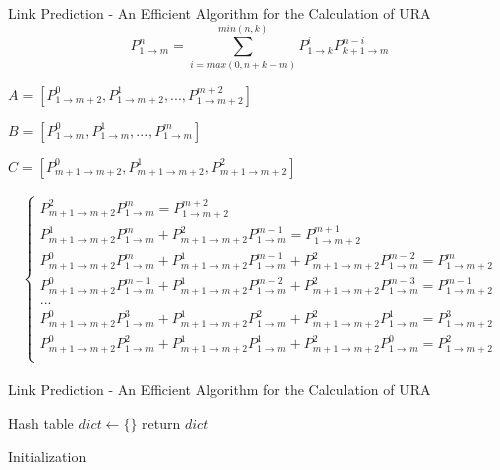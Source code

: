 \documentclass[9pt]{beamer}
\begin{document}
\begin{frame}{Link Prediction - An Efficient Algorithm for the Calculation of URA}
\begin{equation}
P_{1\rightarrow m}^n=\sum_{i=max(0,n+k-m)}^{min(n,k)}P_{1\rightarrow k}^i P_{k+1\rightarrow m}^{n-i}
\label{URA-equation}
\end{equation}

$A = [P_{1\rightarrow m+2}^0, P_{1\rightarrow m+2}^1, ..., P_{1\rightarrow m+2}^{m+2}]$

$B = [P_{1\rightarrow m}^0, P_{1\rightarrow m}^1, ..., P_{1\rightarrow m}^{m}]$

$C = [P_{m+1\rightarrow m+2}^0, P_{m+1\rightarrow m+2}^1, P_{m+1\rightarrow m+2}^2]$

\begin{align*}
\left\{
\begin{aligned}
P_{m+1\rightarrow m+2}^2 P_{1\rightarrow m}^{m} = P_{1\rightarrow m+2}^{m+2}\\
P_{m+1\rightarrow m+2}^1 P_{1\rightarrow m}^{m} + P_{m+1\rightarrow m+2}^2 P_{1\rightarrow m}^{m-1} = P_{1\rightarrow m+2}^{m+1}\\
P_{m+1\rightarrow m+2}^0 P_{1\rightarrow m}^{m} + P_{m+1\rightarrow m+2}^1 P_{1\rightarrow m}^{m-1} + P_{m+1\rightarrow m+2}^2 P_{1\rightarrow m}^{m-2} = P_{1\rightarrow m+2}^{m}\\
P_{m+1\rightarrow m+2}^0 P_{1\rightarrow m}^{m-1} + P_{m+1\rightarrow m+2}^1 P_{1\rightarrow m}^{m-2} + P_{m+1\rightarrow m+2}^2 P_{1\rightarrow m}^{m-3} = P_{1\rightarrow m+2}^{m-1}\\
...\\
P_{m+1\rightarrow m+2}^0 P_{1\rightarrow m}^{3} + P_{m+1\rightarrow m+2}^1 P_{1\rightarrow m}^{2} + P_{m+1\rightarrow m+2}^2 P_{1\rightarrow m}^{1} = P_{1\rightarrow m+2}^3\\
P_{m+1\rightarrow m+2}^0 P_{1\rightarrow m}^{2} + P_{m+1\rightarrow m+2}^1 P_{1\rightarrow m}^{1} + P_{m+1\rightarrow m+2}^2 P_{1\rightarrow m}^{0} = P_{1\rightarrow m+2}^2\\
\end{aligned}
\right.
\end{align*}
\end{frame}

\begin{frame}{Link Prediction - An Efficient Algorithm for the Calculation of URA}

\begin{algorithm}[H]
Hash table $dict \leftarrow \{\}$\;
return $dict$\;
\caption{Initialization}
\end{algorithm}

\end{frame}
\end{document}
